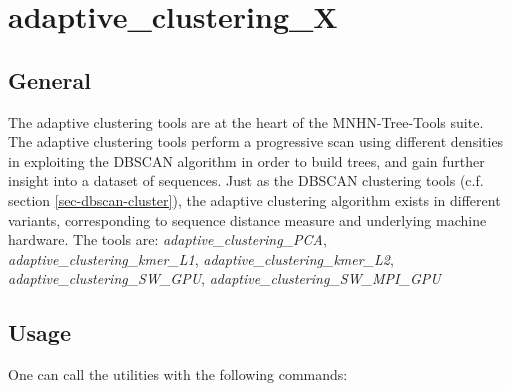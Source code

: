 \section{adaptive\_clustering\_X} \label{sec-adaptive-clust}

\subsection{General}
The adaptive clustering tools are at the heart of the MNHN-Tree-Tools suite.
The adaptive clustering tools perform a progressive scan using
different densities in exploiting the DBSCAN \cite{dbscan} algorithm in order to
build trees, and gain further insight into a dataset of
sequences. Just as the DBSCAN clustering tools (c.f. section
\ref{sec-dbscan-cluster}), the adaptive
clustering algorithm exists in different variants, corresponding to
sequence distance measure and underlying machine hardware. The tools
are: \emph{adaptive\_clustering\_PCA}, \emph{adaptive\_clustering\_kmer\_L1},
\emph{adaptive\_clustering\_kmer\_L2}, \emph{adaptive\_clustering\_SW\_GPU},
\emph{adaptive\_clustering\_SW\_MPI\_GPU} 

\subsection{Usage}

One can call the utilities with the following commands: 

